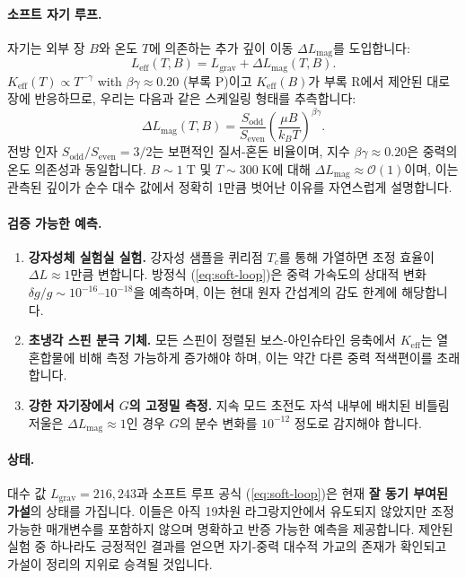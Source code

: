 \documentclass[11pt,a4paper]{article}
\begin{document}
	\paragraph{소프트 자기 루프.}
	자기는 외부 장 $B$와 온도 $T$에 의존하는 추가 깊이 이동 $\Delta L_{\mathrm{mag}}$를 도입합니다:
	\begin{equation}
		L_{\mathrm{eff}}(T,B) = L_{\mathrm{grav}} + \Delta L_{\mathrm{mag}}(T,B).
	\end{equation}
	$K_{\mathrm{eff}}(T) \propto T^{-\gamma}$ with $\beta\gamma \approx 0.20$ (부록 P)이고 $K_{\mathrm{eff}}(B)$가 부록 R에서 제안된 대로 장에 반응하므로, 우리는 다음과 같은 스케일링 형태를 추측합니다:
	\begin{equation}
		\boxed{
			\Delta L_{\mathrm{mag}}(T,B) =
			\frac{S_{\mathrm{odd}}}{S_{\mathrm{even}}}
			\left( \frac{\mu B}{k_B T} \right)^{\beta\gamma}
		}.
		\label{eq:soft-loop}
	\end{equation}
	전방 인자 $S_{\mathrm{odd}}/S_{\mathrm{even}} = 3/2$는 보편적인 질서-혼돈 비율이며, 지수 $\beta\gamma \approx 0.20$은 중력의 온도 의존성과 동일합니다. $B \sim 1\;\mathrm{T}$ 및 $T \sim 300\;\mathrm{K}$에 대해 $\Delta L_{\mathrm{mag}} \approx \mathcal{O}(1)$이며, 이는 관측된 깊이가 순수 대수 값에서 정확히 1만큼 벗어난 이유를 자연스럽게 설명합니다.
	
	\paragraph{검증 가능한 예측.}
	\begin{enumerate}
		\item \textbf{강자성체 실험실 실험.} 강자성 샘플을 퀴리점 $T_c$를 통해 가열하면 조정 효율이 $\Delta L \approx 1$만큼 변합니다. 방정식 (\ref{eq:soft-loop})은 중력 가속도의 상대적 변화 $\delta g / g \sim 10^{-16}$–$10^{-18}$을 예측하며, 이는 현대 원자 간섭계의 감도 한계에 해당합니다.
		\item \textbf{초냉각 스핀 분극 기체.} 모든 스핀이 정렬된 보스-아인슈타인 응축에서 $K_{\mathrm{eff}}$는 열 혼합물에 비해 측정 가능하게 증가해야 하며, 이는 약간 다른 중력 적색편이를 초래합니다.
		\item \textbf{강한 자기장에서 $G$의 고정밀 측정.} 지속 모드 초전도 자석 내부에 배치된 비틀림 저울은 $\Delta L_{\mathrm{mag}} \approx 1$인 경우 $G$의 분수 변화를 $10^{-12}$ 정도로 감지해야 합니다.
	\end{enumerate}
	
	\paragraph{상태.}
	대수 값 $L_{\mathrm{grav}} = 216, 243$과 소프트 루프 공식 (\ref{eq:soft-loop})은 현재 \textbf{잘 동기 부여된 가설}의 상태를 가집니다. 이들은 아직 19차원 라그랑지안에서 유도되지 않았지만 조정 가능한 매개변수를 포함하지 않으며 명확하고 반증 가능한 예측을 제공합니다. 제안된 실험 중 하나라도 긍정적인 결과를 얻으면 자기-중력 대수적 가교의 존재가 확인되고 가설이 정리의 지위로 승격될 것입니다.
	
\end{document}
